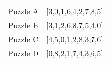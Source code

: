 \begin{table}[h]
    \centering
    \begin{tabular}{|c|c|}
        \hline
        Puzzle A    & [3,0,1,6,4,2,7,8,5]   \\
        Puzzle B    & [3,1,2,6,8,7,5,4,0]   \\
        Puzzle C    & [4,5,0,1,2,8,3,7,6]   \\
        Puzzle D    & [0,8,2,1,7,4,3,6,5]   \\
        \hline
    \end{tabular}
    \label{tab:puzzles}
\end{table}
